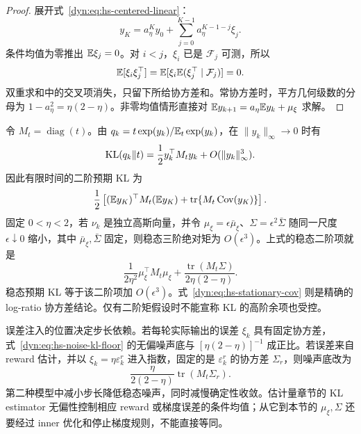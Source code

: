 \begin{proof}
展开式~\eqref{dyn:eq:hs-centered-linear}：
\begin{equation*}
 y_K=a_\eta^Ky_0+\sum_{j=0}^{K-1}a_\eta^{K-1-j}\xi_j.
\end{equation*}
条件均值为零推出 $\mathbb E\xi_j=0$。对 $i<j$，$\xi_i$ 已是 $\mathcal F_j$ 可测，所以
\begin{equation*}
 \mathbb E[\xi_i\xi_j^\top]
 =\mathbb E[\xi_i\mathbb E(\xi_j^\top\mid\mathcal F_j)]=0.
\end{equation*}
双重求和中的交叉项消失，只留下所给协方差和。常协方差时，平方几何级数的分母为 $1-a_\eta^2=\eta(2-\eta)$。非零均值情形直接对 $\mathbb E y_{k+1}=a_\eta\mathbb E y_k+\mu_\xi$ 求解。
\end{proof}

令 $M_t=\operatorname{diag}(t)$。由 $q_k=t\exp(y_k)/\mathbb E_t\exp(y_k)$，在 $\|y_k\|_\infty\to0$ 时有
\begin{equation*}
 \operatorname{KL}(q_k\Vert t)=\frac12 y_k^\top M_t y_k
                   +O(\|y_k\|_\infty^3).
\end{equation*}
因此有限时间的二阶预期 KL 为
\begin{equation*}
 \frac12\left[(\mathbb E y_K)^\top M_t(\mathbb E y_K)
             +\operatorname{tr}\{M_t\operatorname{Cov}(y_K)\}\right].
\end{equation*}
固定 $0<\eta<2$，若 $\nu_k$ 是独立高斯向量，并令 $\mu_\xi=\epsilon\bar\mu_\xi$、$\Sigma=\epsilon^2\bar\Sigma$ 随同一尺度 $\epsilon\downarrow0$ 缩小，其中 $\bar\mu_\xi,\bar\Sigma$ 固定，则稳态三阶绝对矩为 $O(\epsilon^3)$。上式的稳态二阶项就是
\begin{equation}\label{dyn:eq:hs-noise-kl-floor}
 \frac{1}{2\eta^2}\mu_\xi^\top M_t\mu_\xi
 +\frac{\operatorname{tr}(M_t\Sigma)}{2\eta(2-\eta)}.
\end{equation}
稳态预期 KL 等于该二阶项加 $O(\epsilon^3)$。式~\eqref{dyn:eq:hs-stationary-cov} 则是精确的 log-ratio 协方差结论。仅有二阶矩假设时不能宣称 KL 的高阶余项也受控。

误差注入的位置决定步长依赖。若每轮实际输出的误差 $\xi_k$ 具有固定协方差，式~\eqref{dyn:eq:hs-noise-kl-floor} 的无偏噪声底与 $[\eta(2-\eta)]^{-1}$ 成正比。若误差来自 reward 估计，并以 $\xi_k=\eta\varepsilon_k^{r}$ 进入指数，固定的是 $\varepsilon_k^{r}$ 的协方差 $\Sigma_r$，则噪声底改为
\begin{equation*}
 \frac{\eta}{2(2-\eta)}\operatorname{tr}(M_t\Sigma_r).
\end{equation*}
第二种模型中减小步长降低稳态噪声，同时减慢确定性收敛。估计量章节的 KL estimator 无偏性控制相应 reward 或梯度误差的条件均值；从它到本节的 $\mu_\xi,\Sigma$ 还要经过 inner 优化和停止梯度规则，不能直接等同。

